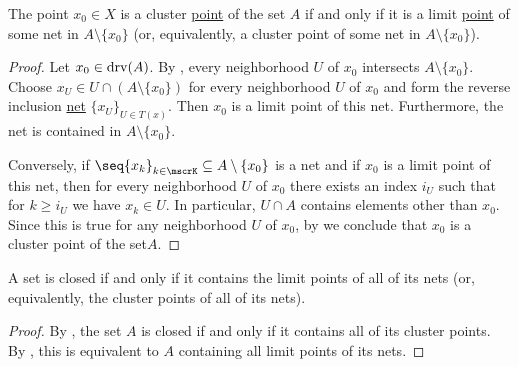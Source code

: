 \begin{proposition}\label{thm:cluster_point_of_set_iff_limit_point_of_net}
  The point \( x_0 \in X \) is a cluster \hyperref[def:set_cluster_point]{point} of the set \( A \) if and only if it is a limit \hyperref[def:net_convergence/cluster]{point} of some net in \( A \setminus \{ x_0 \} \) (or, equivalently, a cluster point of some net in \( A \setminus \{ x_0 \} \)).
\end{proposition}
\begin{proof}
  \SufficiencySubProof Let \( x_0 \in \operatorname{drv}(A) \). By , every neighborhood \( U \) of \( x_0 \) intersects \( A \setminus \{ x_0 \} \). Choose \( x_U \in U \cap (A \setminus \{ x_0 \}) \) for every neighborhood \( U \) of \( x_0 \) and form the reverse inclusion \hyperref[ex:def:net_limit_point/reverse]{net} \( \{ x_U \}_{U \in T(x)} \). Then \( x_0 \) is a limit point of this net. Furthermore, the net is contained in \( A \setminus \{ x_0 \} \).

  \NecessitySubProof Conversely, if \( \seq{ x_k }_{k \in \mscrK} \subseteq A \setminus \{ x_0 \} \) is a net and if \( x_0 \) is a limit point of this net, then for every neighborhood \( U \) of \( x_0 \) there exists an index \( i_U \) such that for \( k \geq i_U \) we have \(  x_k \in U \). In particular, \( U \cap A \) contains elements other than \( x_0 \). Since this is true for any neighborhood \( U \) of \( x_0 \), by  we conclude that \( x_0 \) is a cluster point of the set\( A \).
\end{proof}

\begin{corollary}\label{thm:closed_iff_contains_all_net_cluster_points}
  A set is closed if and only if it contains the limit points of all of its nets (or, equivalently, the cluster points of all of its nets).
\end{corollary}
\begin{proof}
  By , the set \( A \) is closed if and only if it contains all of its cluster points. By , this is equivalent to \( A \) containing all limit points of its nets.
\end{proof}


